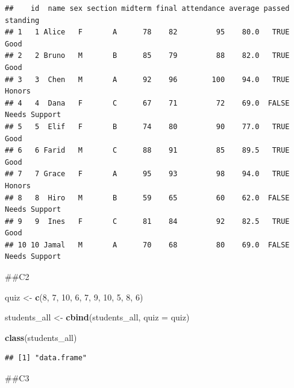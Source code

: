 \documentclass[
]{article}
\newenvironment{Shaded}{\begin{snugshade}}{\end{snugshade}}
\newcommand{\AttributeTok}[1]{\textcolor[rgb]{0.13,0.29,0.53}{#1}}
\newcommand{\DecValTok}[1]{\textcolor[rgb]{0.00,0.00,0.81}{#1}}
\newcommand{\FunctionTok}[1]{\textcolor[rgb]{0.13,0.29,0.53}{\textbf{#1}}}
\newcommand{\NormalTok}[1]{#1}
\newcommand{\OtherTok}[1]{\textcolor[rgb]{0.56,0.35,0.01}{#1}}
\newcommand{\SpecialCharTok}[1]{\textcolor[rgb]{0.81,0.36,0.00}{\textbf{#1}}}
\begin{document}
\begin{verbatim}
##    id  name sex section midterm final attendance average passed      standing
## 1   1 Alice   F       A      78    82         95    80.0   TRUE          Good
## 2   2 Bruno   M       B      85    79         88    82.0   TRUE          Good
## 3   3  Chen   M       A      92    96        100    94.0   TRUE        Honors
## 4   4  Dana   F       C      67    71         72    69.0  FALSE Needs Support
## 5   5  Elif   F       B      74    80         90    77.0   TRUE          Good
## 6   6 Farid   M       C      88    91         85    89.5   TRUE          Good
## 7   7 Grace   F       A      95    93         98    94.0   TRUE        Honors
## 8   8  Hiro   M       B      59    65         60    62.0  FALSE Needs Support
## 9   9  Ines   F       C      81    84         92    82.5   TRUE          Good
## 10 10 Jamal   M       A      70    68         80    69.0  FALSE Needs Support
\end{verbatim}

\#\#C2

\begin{Shaded}
\begin{Highlighting}[]
\NormalTok{quiz }\OtherTok{\textless{}{-}} \FunctionTok{c}\NormalTok{(}\DecValTok{8}\NormalTok{, }\DecValTok{7}\NormalTok{, }\DecValTok{10}\NormalTok{, }\DecValTok{6}\NormalTok{, }\DecValTok{7}\NormalTok{, }\DecValTok{9}\NormalTok{, }\DecValTok{10}\NormalTok{, }\DecValTok{5}\NormalTok{, }\DecValTok{8}\NormalTok{, }\DecValTok{6}\NormalTok{)}

\NormalTok{students\_all }\OtherTok{\textless{}{-}} \FunctionTok{cbind}\NormalTok{(students\_all, }\AttributeTok{quiz =}\NormalTok{ quiz)}

\FunctionTok{class}\NormalTok{(students\_all)}
\end{Highlighting}
\end{Shaded}

\begin{verbatim}
## [1] "data.frame"
\end{verbatim}

\#\#C3

\begin{Shaded}
\end{Shaded}
\end{document}
